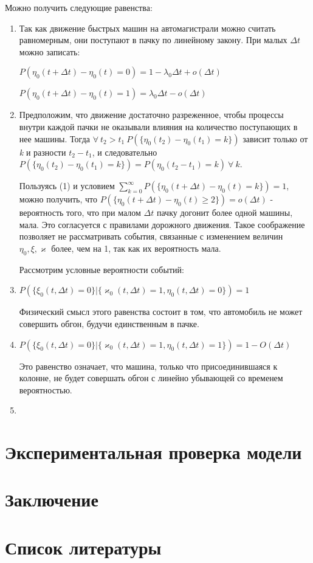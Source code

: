\documentclass[a4paper, 14pt, russian]{article}
\begin{document}
Можно получить следующие равенства:

\begin{enumerate} 
\item Так как движение быстрых машин на автомагистрали можно считать равномерным, они поступают в пачку по линейному закону. При малых $\Delta t$ можно записать:

$P(\eta_0(t+ \Delta t) - \eta_0(t) = 0) = 1 - \lambda_0 \Delta t + o(\Delta t)$

$P(\eta_0(t+ \Delta t) - \eta_0(t) = 1) = \lambda_0 \Delta t - o(\Delta t)$

\item Предположим, что движение достаточно разреженное, чтобы процессы внутри каждой пачки не оказывали влияния на количество поступающих в нее машины. Тогда $\forall \ t_2 > t_1 \ P(\{\eta_0(t_2) - \eta_0(t_1) = k\})$ зависит только от \textit{k} и разности $t_2 - t_1$, и следовательно $P(\{\eta_0(t_2) - \eta_0(t_1) = k\}) = P({\eta_0(t_2 - t_1) = k}) \ \forall \ k$.

Пользуясь (1) и условием $\sum_{k = 0}^{\infty}P(\{\eta_0(t+\Delta t) - \eta_0(t) = k\}) = 1$, можно получить, что $P(\{\eta_0(t+\Delta t) - \eta_0(t) \geq 2 \}) = o(\Delta t)$ - вероятность того, что при малом $\Delta t$ пачку догонит более одной машины, мала. Это согласуется с правилами дорожного движения. Такое соображение позволяет не рассматривать события, связанные с изменением величин $\eta_0, \xi, \varkappa$ более, чем на 1, так как их вероятность мала.

Рассмотрим условные вероятности событий:
\item $P(\{\xi_0(t, \Delta t) = 0\} | \{ \varkappa_0(t, \Delta t) = 1, \eta_0(t, \Delta t) = 0\}) = 1$

Физический смысл этого равенства состоит в том, что автомобиль не может совершить обгон, будучи единственным в пачке.

\item $P(\{\xi_0(t, \Delta t) = 0\} | \{ \varkappa_0(t, \Delta t) = 1, \eta_0(t, \Delta t) = 1\}) = 1 - O(\Delta t)$

Это равенство означает, что машина, только что присоединившаяся к колонне, не будет совершать обгон с линейно убывающей со временем вероятностью.

\item 

\end{enumerate} 

\subsection{}
\section{Экспериментальная проверка модели}

\section{Заключение}

\section{Список литературы}
\end{document}
